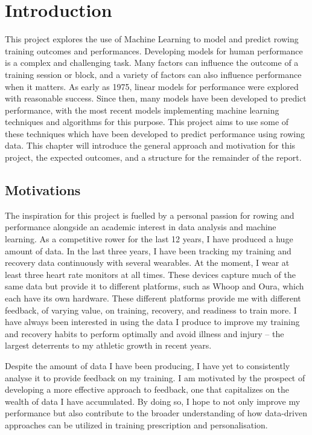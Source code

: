\chapter{\label{ch:intro}Introduction}
This project explores the use of Machine Learning to model and predict rowing training outcomes and performances. Developing models for human performance is a complex and challenging task. Many factors can influence the outcome of a training session or block, and a variety of factors can also influence performance when it matters. As early as 1975, linear models for performance were explored with reasonable success. Since then, many models have been developed to predict performance, with the most recent models implementing machine learning techniques and algorithms for this purpose. This project aims to use some of these techniques which have been developed to predict performance using rowing data. This chapter will introduce the general approach and motivation for this project, the expected outcomes, and a structure for the remainder of the report.

\section{Motivations}
The inspiration for this project is fuelled by a personal passion for rowing and performance alongside an academic interest in data analysis and machine learning. As a competitive rower for the last 12 years, I have produced a huge amount of data. In the last three years, I have been tracking my training and recovery data continuously with several wearables. At the moment, I wear at least three heart rate monitors at all times. These devices capture much of the same data but provide it to different platforms, such as Whoop and Oura, which each have its own hardware. These different platforms provide me with different feedback, of varying value, on training, recovery, and readiness to train more. I have always been interested in using the data I produce to improve my training and recovery habits to perform optimally and avoid illness and injury -- the largest deterrents to my athletic growth in recent years. 

Despite the amount of data I have been producing, I have yet to consistently analyse it to provide feedback on my training. I am motivated by the prospect of developing a more effective approach to feedback, one that capitalizes on the wealth of data I have accumulated. By doing so, I hope to not only improve my performance but also contribute to the broader understanding of how data-driven approaches can be utilized in training prescription and personalisation.

